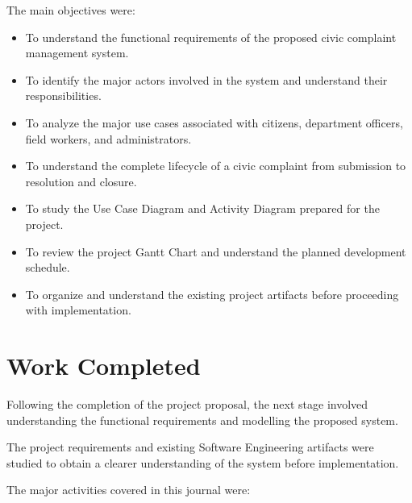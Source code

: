 \documentclass[12pt,a4paper]{article}
\begin{document}
The main objectives were:

\begin{itemize}[leftmargin=*]

\item To understand the functional requirements of the proposed civic complaint management system.

\item To identify the major actors involved in the system and understand their responsibilities.

\item To analyze the major use cases associated with citizens, department officers, field workers, and administrators.

\item To understand the complete lifecycle of a civic complaint from submission to resolution and closure.

\item To study the Use Case Diagram and Activity Diagram prepared for the project.

\item To review the project Gantt Chart and understand the planned development schedule.

\item To organize and understand the existing project artifacts before proceeding with implementation.

\end{itemize}


\section{Work Completed}

Following the completion of the project proposal, the next stage involved understanding the functional requirements and modelling the proposed system.

The project requirements and existing Software Engineering artifacts were studied to obtain a clearer understanding of the system before implementation.

The major activities covered in this journal were:
\end{document}

